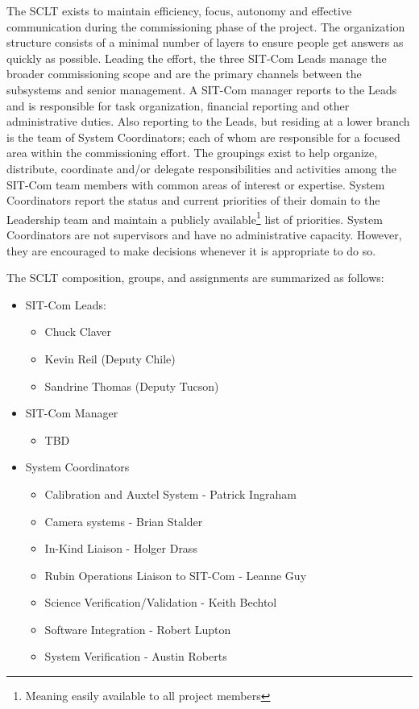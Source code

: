 \documentclass[SE,lsstdraft,authoryear,toc]{lsstdoc}
\begin{document}
The SCLT exists to maintain efficiency, focus, autonomy and effective communication during the commissioning phase of the project.
The organization structure consists of a minimal number of layers to ensure people get answers as quickly as possible.
Leading the effort, the three SIT-Com Leads manage the broader commissioning scope and are the primary channels between the subsystems and senior management.
A SIT-Com manager reports to the Leads and is responsible for task organization, financial reporting and other administrative duties.
Also reporting to the Leads, but residing at a lower branch is the team of System Coordinators; each of whom are responsible for a focused area within the commissioning effort.
The groupings exist to help organize, distribute, coordinate and/or delegate responsibilities and activities among the SIT-Com team members with common areas of interest or expertise.
System Coordinators report the status and current priorities of their domain to the Leadership team and maintain a publicly available\footnote{Meaning easily available to all project members} list of priorities.
System Coordinators are not supervisors and have no administrative capacity.
However, they are encouraged to make decisions whenever it is appropriate to do so.

The SCLT composition, groups, and assignments are summarized as follows:
\begin{itemize}
    \item SIT-Com Leads:
    \begin{itemize}
        \item Chuck Claver
        \item Kevin Reil (Deputy Chile)
        \item Sandrine Thomas (Deputy Tucson)
    \end{itemize}
    \item SIT-Com Manager
    \begin{itemize}
        \item TBD
    \end{itemize}
    \item System Coordinators
    \begin{itemize}
        \item Calibration and Auxtel System - Patrick Ingraham
        \item Camera systems - Brian Stalder
        \item In-Kind Liaison - Holger Drass
        \item Rubin Operations Liaison to SIT-Com - Leanne Guy
        \item Science Verification/Validation - Keith Bechtol
        \item Software Integration - Robert Lupton
        \item System Verification - Austin Roberts
    \end{itemize}
\end{itemize}
\end{document}
